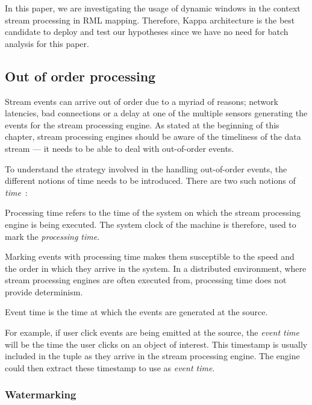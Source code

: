 In this paper, we are investigating the usage of dynamic windows in the context stream processing 
in RML mapping. 
Therefore, Kappa architecture is the best candidate to deploy and test our 
hypotheses since we have no need for batch analysis for this paper.  

\subsection{Out of order processing}%
\label{sub:Out of order processing}
Stream events can arrive out of order due to a myriad of reasons; network latencies, 
bad connections or a delay at one of the multiple sensors generating the events for 
the stream processing engine. As stated at the beginning of this chapter, stream 
processing engines should be aware of the timeliness of the data stream --- it needs 
to be able to deal with out-of-order events. 

To understand the strategy involved in the handling out-of-order events, 
the different notions of time needs to be introduced. There are two such notions 
of \emph{time}~\cite{watermark_flink}:  

\begin{defn}
    Processing time refers to the time of the system on which the stream processing 
    engine is being executed. The system clock of the machine is therefore, used 
    to mark the \emph{processing time}. 
\end{defn}
Marking events with processing time makes them 
susceptible to the speed and the order in which they arrive in the system. 
In a distributed environment, where stream processing engines are often 
executed from, processing time does not provide determinism. 


\begin{defn}
    Event time is the time at which the events are generated at the source.
\end{defn}
For example, if user click events are being emitted at the
source, the \emph{event time} will be the time the user clicks on an object of 
interest. This timestamp is usually included in the tuple as they arrive 
in the stream processing engine. The engine could then extract these 
timestamp to use as \emph{event time}. 


\subsubsection{Watermarking}%
\label{ssub:Watermarking}

